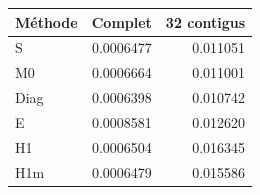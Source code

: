\begin{tabular}{lrr}
\toprule Méthode & Complet & 32 contigus\\\midrule
S & 0.0006477 & 0.011051\\
M0 & 0.0006664 & 0.011001\\
Diag & 0.0006398 & 0.010742\\
E & 0.0008581 & 0.012620\\
H1 & 0.0006504 & 0.016345\\
H1m & 0.0006479 & 0.015586\\
\bottomrule
\end{tabular}
